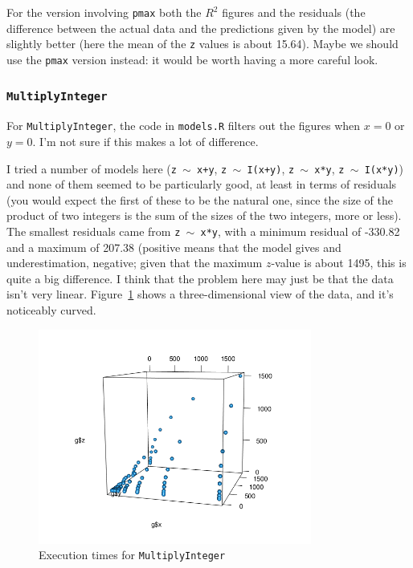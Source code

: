 \documentclass[a4paper]{article}
\begin{document}
For the version involving \verb|pmax| both the $R^2$ figures and the
residuals (the difference between the actual data and the predictions
given by the model) are slightly better (here the mean of the \verb|z|
values is about 15.64). Maybe we should use the \texttt{pmax} version
instead: it would be worth having a more careful look.


\subsubsection*{\texttt{MultiplyInteger}}
For \verb|MultiplyInteger|, the code in \verb|models.R| filters out the figures
when $x=0$ or $y=0$.  I'm not sure if this makes a lot of difference.

I tried a number of models here (\texttt{z $\sim$ x+y}, \texttt{z
  $\sim$ I(x+y)}, \texttt{z $\sim$ x*y}, \texttt{z $\sim$ I(x*y)})
and none of them seemed to be particularly good, at least in terms of
residuals (you would expect the first of these to be the natural one,
since the size of the product of two integers is the sum of the sizes
of the two integers, more or less).  The smallest residuals came from
\texttt{z $\sim$ x*y}, with a minimum residual of -330.82 and a
maximum of 207.38 (positive means that the model gives and
underestimation, negative; given that the maximum $z$-value is about
1495, this is quite a big difference.  I think that the problem here
may just be that the data isn't very linear.
Figure~\ref{fig:mul-plot-large} shows a three-dimensional view of the
data, and it's noticeably curved.

\begin{figure}[!ht]
\centering
  \includegraphics[width=0.8\textwidth]{figures/mul-large.png}
  \caption{Execution times for \texttt{MultiplyInteger}}
  \label{fig:mul-plot-large}
\end{figure}
\end{document}
